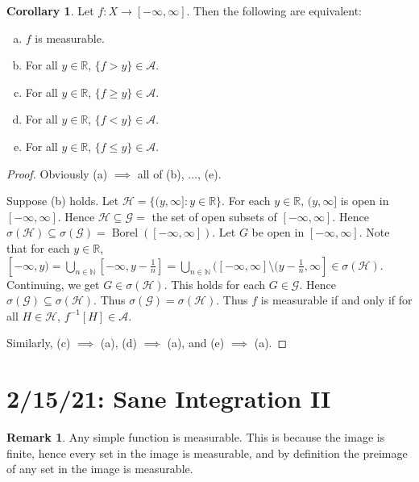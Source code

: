 \documentclass{article}
\DeclareMathOperator{\Borel}{Borel}
\newcommand{\R}{\mathbb{R}}
\newcommand{\N}{\mathbb{N}}
\theoremstyle{definition}
\newtheorem{corollary}[theorem]{Corollary}
\newtheorem*{remark}{Remark}
\begin{document}
\begin{corollary}
    Let $f:X \longrightarrow [-\infty, \infty]$. Then the following are equivalent:
    \begin{enumerate}[(a)]
        \item $f$ is measurable.
        \item For all $y \in \R$, $\{f > y\} \in \mathscr{A}$.
        \item For all $y \in \R$, $\{f \geq y\} \in \mathscr{A}$.
        \item For all $y \in \R$, $\{f < y\} \in \mathscr{A}$.
        \item For all $y \in \R$, $\{f \leq y\} \in \mathscr{A}$.
    \end{enumerate}
\end{corollary}
\begin{proof}
    Obviously (a) $\implies$ all of (b), $\ldots$, (e).
    
    Suppose (b) holds. Let $\mathscr{H} = \{(y, \infty] : y \in \R\}$. For each $y \in \R$, $(y, \infty]$ is open in $[-\infty, \infty]$. Hence $\mathscr{H} \subseteq \mathscr{G} =$ the set of open subsets of $[-\infty, \infty]$. Hence $\sigma(\mathscr{H}) \subseteq \sigma(\mathscr{G}) = \Borel([-\infty, \infty])$.
    Let $G$ be open in $[-\infty, \infty]$. Note that for each $y \in \R$, $[-\infty, y) = \bigcup_{n \in \N} [-\infty, y-\frac{1}{n}] = \bigcup_{n \in \N} ([-\infty, \infty] \setminus (y-\frac{1}{n}, \infty] \in \sigma(\mathscr{H})$. Continuing, we get $G \in \sigma(\mathscr{H})$. This holds for each $G \in \mathscr{G}$. Hence $\sigma(\mathscr{G}) \subseteq \sigma(\mathscr{H})$. Thus $\sigma(\mathscr{G}) = \sigma(\mathscr{H})$. Thus $f$ is measurable if and only if for all $H \in \mathscr{H}$, $f^{-1}[H] \in \mathscr{A}$.
    
    Similarly, (c) $ \implies$ (a), (d) $ \implies$ (a), and (e) $ \implies$ (a).
\end{proof}

\section*{2/15/21: Sane Integration II}

\begin{remark}
Any simple function is measurable. This is because the image is finite, hence every set in the image is measurable, and by definition the preimage of any set in the image is measurable. 
\end{remark}
\end{document}
